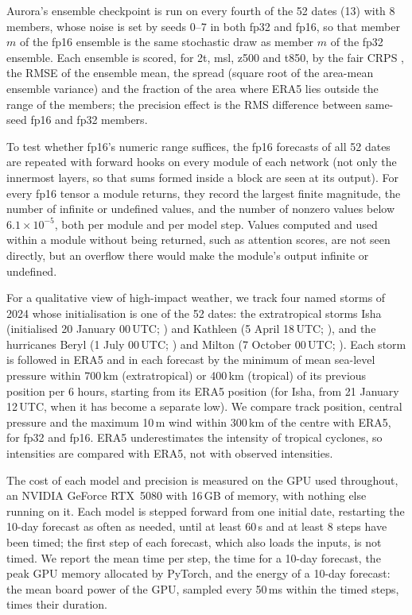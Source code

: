Aurora's ensemble checkpoint is run on every fourth of the 52
dates (13) with 8 members, whose noise is set by seeds 0--7 in both fp32
and fp16, so that member $m$ of the fp16 ensemble is the same stochastic
draw as member $m$ of the fp32 ensemble. Each ensemble is scored, for
2t, msl, z500 and t850, by the
fair CRPS \citep{ferro2014fair}, the RMSE of the ensemble mean, the spread
(square root of the area-mean ensemble variance) and the fraction of the
area where ERA5 lies outside the range of the members; the precision effect
is the RMS difference between same-seed fp16 and fp32 members.

To test whether fp16's numeric range suffices, the fp16 forecasts of
all 52 dates are repeated with forward hooks on every module of each
network (not only the innermost layers, so that sums formed inside a
block are seen at its output). For every fp16 tensor a module returns,
they record the largest finite magnitude, the number of infinite or
undefined values, and the number of nonzero values below
$6.1\times10^{-5}$, both per module and per model step. Values computed
and used within a module without being returned, such as attention
scores, are not seen directly, but an overflow there would make the
module's output infinite or undefined.

For a qualitative view of high-impact weather, we track four named
storms of 2024 whose initialisation is one of the 52 dates: the
extratropical storms Isha (initialised 20 January 00\,UTC;
\citealp{metoffice2024isha}) and Kathleen (5 April 18\,UTC;
\citealp{metoffice2024kathleen}), and the hurricanes Beryl (1 July 00\,UTC;
\citealp{beven2025beryl}) and Milton (7 October 00\,UTC;
\citealp{beven2025milton}). Each storm is followed in ERA5 and in each forecast
by the minimum of mean sea-level pressure within 700\,km (extratropical)
or 400\,km (tropical) of its previous position per 6 hours, starting from
its ERA5 position (for Isha, from 21 January 12\,UTC, when it has become a
separate low). We compare track position, central pressure and the
maximum 10\,m wind within 300\,km of the centre with ERA5, for fp32 and
fp16. ERA5 underestimates the
intensity of tropical cyclones, so intensities are compared with ERA5,
not with observed intensities.

The cost of each model and precision is measured on the GPU used
throughout, an NVIDIA GeForce RTX~5080 with 16\,GB of memory, with
nothing else running on it. Each model is stepped forward from one
initial date, restarting the 10-day forecast as often as needed, until at
least 60\,s and at least 8 steps have been timed; the first step of each
forecast, which also loads the inputs, is not timed. We report the mean
time per step, the time for a 10-day forecast, the peak GPU memory
allocated by PyTorch, and the energy of a 10-day forecast: the mean board
power of the GPU, sampled every 50\,ms within the timed steps, times
their duration.

